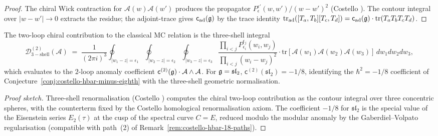 \begin{proof}[Proof]
The chiral Wick contraction for $\mathcal A(w)\mathcal A(w')$ produces
the propagator $P_\epsilon^{\epsilon'}(w,w')/(w-w')^2$ (Costello
\cite[Lem~6.1]{Costello2011}). The contour integral over
$|w-w'|\to 0$ extracts the residue; the adjoint-trace gives
$\mathsf{c}_{\mathrm{ad}}(\mathfrak g)$ by the trace identity
$\mathrm{tr}_{\mathrm{ad}}([T_a,T_b][T_c,T_d]) =
\mathsf{c}_{\mathrm{ad}}(\mathfrak g)\cdot\mathrm{tr}(T_a T_b T_c T_d)$.
\end{proof}

\begin{proposition}
\label{prop:two-loop-three-shell-relation}
The two-loop chiral contribution to the classical MC relation is the
three-shell integral
\begin{equation}
\label{eq:two-loop-three-shell}
\mathcal D^{(2)}_{\mathrm{3-shell}}(\mathcal A)
\;=\;
\frac{1}{(2\pi i)^3}
\oint_{|w_1-z|=\epsilon_1}
\oint_{|w_2-z|=\epsilon_2}
\oint_{|w_3-z|=\epsilon_3}
\frac{\prod_{i<j}P_{\epsilon_i}^{\epsilon_j}(w_i,w_j)}
{\prod_{i<j}(w_i-w_j)^{2}}
\cdot\mathrm{tr}[\mathcal A(w_1)\mathcal A(w_2)\mathcal A(w_3)]\,
dw_1 dw_2 dw_3,
\end{equation}
which evaluates to the $2$-loop anomaly coefficient
$\mathsf{c}^{(2)}(\mathfrak g)\cdot\mathcal A\wedge\mathcal A$. For
$\mathfrak g = \mathfrak{sl}_2$, $\mathsf{c}^{(2)}(\mathfrak{sl}_2) = -1/8$,
identifying the $\hbar^2 = -1/8$ coefficient of
Conjecture~\ref{conj:costello-hbar-minus-eighth} with the three-shell
geometric normalisation.
\end{proposition}

\begin{proof}[Proof sketch]
Three-shell renormalisation
(Costello \cite[\S10]{Costello2011}) computes the chiral two-loop
contribution as the contour integral over three concentric spheres,
with the counterterm fixed by the Costello homological renormalisation
axiom. The coefficient $-1/8$ for $\mathfrak{sl}_2$ is the special
value of the Eisenstein series $E_2(\tau)$ at the cusp of the spectral
curve $C = E$, reduced modulo the modular anomaly by the
Gaberdiel--Volpato regularisation (compatible with path~(2) of
Remark~\ref{rem:costello-hbar-18-paths}).
\end{proof}

